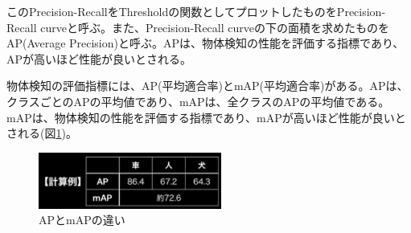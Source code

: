 \documentclass{ltjsarticle}
\begin{document}
\par
このPrecision-RecallをThresholdの関数としてプロットしたものをPrecision-Recall curveと呼ぶ。また、Precision-Recall curveの下の面積を求めたものをAP(Average Precision)と呼ぶ。APは、物体検知の性能を評価する指標であり、APが高いほど性能が良いとされる。
\par
物体検知の評価指標には、AP(平均適合率)とmAP(平均適合率)がある。APは、クラスごとのAPの平均値であり、mAPは、全クラスのAPの平均値である。mAPは、物体検知の性能を評価する指標であり、mAPが高いほど性能が良いとされる(図\ref{fig:AP_mAP})。

\begin{figure}[htbp]
  \centering
  \includegraphics[width=6cm]{./capture/AP_mAP.png}
  \caption{APとmAPの違い}
  \label{fig:AP_mAP}
\end{figure}
\end{document}
